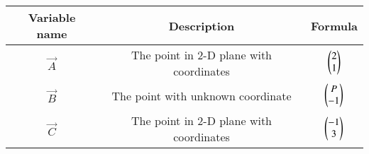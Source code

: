 \begin{center}
	\begin{tabular}{|c|c|c|}
    \hline
    \textbf{Variable name} & \textbf{Description} & \textbf{Formula}\\ 
    \hline
	    $\vec{A}$  & The point in 2-D plane with coordinates & $\begin{pmatrix}2\\ 1\end{pmatrix}$ \\
    \hline 
	    $\vec{B}$  & The point with unknown coordinate  & $\begin{pmatrix}P \\ -1\end{pmatrix}$ \\
    \hline
            $\vec{C}$  & The point in 2-D plane with coordinates & $\begin{pmatrix}-1\\3\end{pmatrix}$ \\
    \hline   
    \end{tabular}
\end{center}
